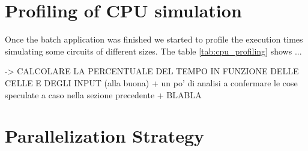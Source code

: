 \section{Profiling of CPU simulation}\label{sec:cpu_profiling}
Once the batch application was finished we started to profile the execution times simulating some circuits of different sizes. The table \ref{tab:cpu_profiling} shows ...\newline
\begin{table}[h!tb]
   \centering \caption{Table caption}
   \label{tab:cpu_profiling}
   \vskip 0.2cm
 \end{table}
-> CALCOLARE LA PERCENTUALE DEL TEMPO IN FUNZIONE DELLE CELLE E DEGLI INPUT (alla buona) + un po' di analisi a confermare le cose speculate a caso nella sezione precedente + BLABLA


\section{Parallelization Strategy}
